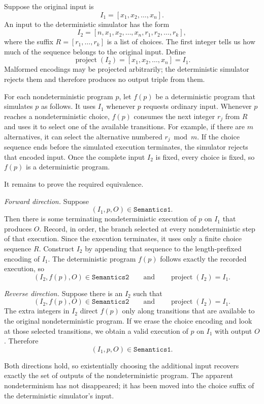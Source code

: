 \documentclass{article}
\begin{document}
\begin{enumerate}
\begin{enumerate}[(a)]
Suppose the original input is
\[
I_1=[x_1,x_2,\ldots,x_n].
\]
An input to the deterministic simulator has the form
\[
I_2=[n,x_1,x_2,\ldots,x_n,r_1,r_2,\ldots,r_k],
\]
where the suffix $R=[r_1,\ldots,r_k]$ is a list of choices.  The first
integer tells us how much of the sequence belongs to the original input.
Define
\[
\operatorname{project}(I_2)=[x_1,x_2,\ldots,x_n]=I_1.
\]
Malformed encodings may be projected arbitrarily; the deterministic
simulator rejects them and therefore produces no output triple from them.

For each nondeterministic program $p$, let $f(p)$ be a deterministic program
that simulates $p$ as follows.  It uses $I_1$ whenever $p$ requests ordinary
input.  Whenever $p$ reaches a nondeterministic choice, $f(p)$ consumes the
next integer $r_j$ from $R$ and uses it to select one of the available
transitions.  For example, if there are $m$ alternatives, it can select the
alternative numbered $r_j\bmod m$.  If the choice sequence ends before the
simulated execution terminates, the simulator rejects that encoded input.
Once the complete input $I_2$ is fixed, every choice is fixed, so $f(p)$ is a
deterministic program.

It remains to prove the required equivalence.

\emph{Forward direction.}
Suppose
\[
(I_1,p,O)\in\texttt{Semantics1}.
\]
Then there is some terminating nondeterministic execution of $p$ on $I_1$
that produces $O$.  Record, in order, the branch selected at every
nondeterministic step of that execution.  Since the execution terminates, it
uses only a finite choice sequence $R$.  Construct $I_2$ by appending that
sequence to the length-prefixed encoding of $I_1$.  The deterministic program
$f(p)$ follows exactly the recorded execution, so
\[
(I_2,f(p),O)\in\texttt{Semantics2}
\qquad\text{and}\qquad
\operatorname{project}(I_2)=I_1.
\]

\emph{Reverse direction.}
Suppose there is an $I_2$ such that
\[
(I_2,f(p),O)\in\texttt{Semantics2}
\qquad\text{and}\qquad
\operatorname{project}(I_2)=I_1.
\]
The extra integers in $I_2$ direct $f(p)$ only along transitions that are
available to the original nondeterministic program.  If we erase the choice
encoding and look at those selected transitions, we obtain a valid execution
of $p$ on $I_1$ with output $O$.  Therefore
\[
(I_1,p,O)\in\texttt{Semantics1}.
\]

Both directions hold, so existentially choosing the additional input recovers
exactly the set of outputs of the nondeterministic program.  The apparent
nondeterminism has not disappeared; it has been moved into the choice suffix
of the deterministic simulator's input.
\end{enumerate}


\end{enumerate}
\end{document}
